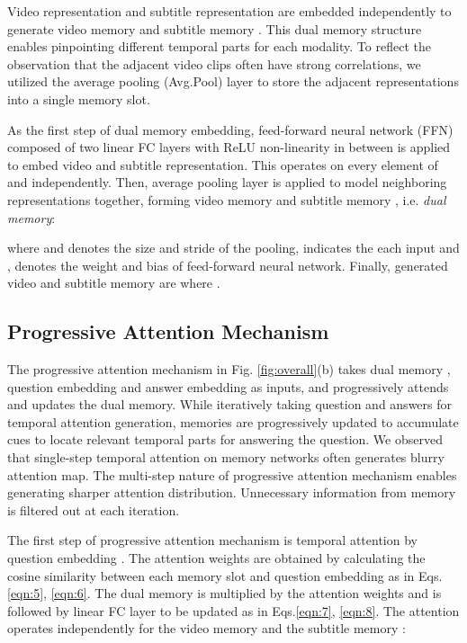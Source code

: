 \documentclass[10pt,twocolumn,letterpaper]{article}
\begin{document}
Video representation  and subtitle representation  are embedded independently to generate video memory  and subtitle memory . This dual memory structure enables pinpointing different temporal parts for each modality. To reflect the observation that the adjacent video clips often have strong correlations, we utilized the average pooling (Avg.Pool) layer to store the adjacent representations into a single memory slot. 


As the first step of dual memory embedding, feed-forward neural network (FFN) composed of two linear FC layers with ReLU non-linearity in between is applied to embed video and subtitle representation. This operates on every element of  and  independently. Then, average pooling layer is applied to model neighboring representations together, forming video memory  and subtitle memory , i.e. \textit{dual memory}:

where  and  denotes the size and stride of the pooling,  indicates the each input and ,  denotes the weight and bias of feed-forward neural network. Finally, generated video and subtitle memory are  where .





\subsection{Progressive Attention Mechanism}
\label{ssec:3.3}
The progressive attention mechanism in Fig. \ref{fig:overall}(b) takes dual memory , question embedding  and answer embedding  as inputs, and progressively attends and updates the dual memory. While iteratively taking question and answers for temporal attention generation, memories are progressively updated to accumulate cues to locate relevant temporal parts for answering the question. We observed that single-step temporal attention on memory networks \cite{MovieQA,rwmn} often generates blurry attention map.	The multi-step nature of progressive attention mechanism enables generating sharper attention distribution. Unnecessary information from memory is filtered out at each iteration. 

The first step of progressive attention mechanism is temporal attention by question embedding . The attention weights are obtained by calculating the cosine similarity between each memory slot and question embedding  as in Eqs.\ref{eqn:5}, \ref{eqn:6}. The dual memory is multiplied by the attention weights and is followed by linear FC layer to be updated as in Eqs.\ref{eqn:7}, \ref{eqn:8}. The attention operates independently for the video memory  and the subtitle memory :
\end{document}
